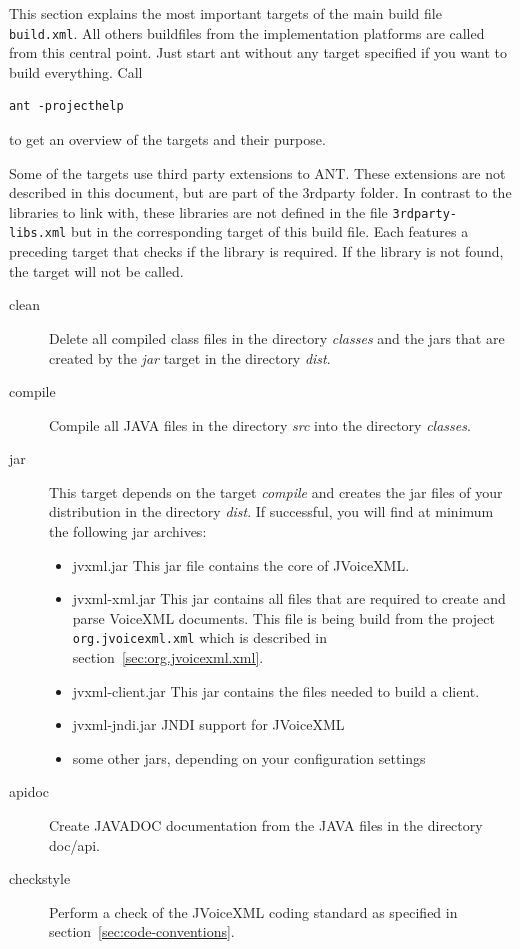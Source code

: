\documentclass[11pt,a4paper]{article}
\begin{document}
This section explains the most important targets of the main build file
\texttt{build.xml}. All others buildfiles from the implementation platforms
are called from this central point. Just start ant without any target specified
if you want to build everything. Call
\begin{lstlisting}
ant -projecthelp
\end{lstlisting}
to get an overview of the targets and their purpose.

Some of the targets use third party extensions to ANT. These 
extensions are not described in this document, but are part of
the 3rdparty folder. In contrast to the libraries to link with,
these libraries are not defined in the file \texttt{3rdparty-libs.xml}
but in the corresponding target of this build file. Each features
a preceding target that checks if the library is required. If
the library is not found, the target will not be called.

\begin{description}
\item[clean]
Delete all compiled class files in the directory \emph{classes}
and the jars that are created by the \emph{jar} target in the directory 
\emph{dist}.

\item[compile]
 Compile all JAVA files in the directory \emph{src} into the directory
\emph{classes}.

\item[jar]
 This target depends on the target \emph{compile} and creates the jar
files of your distribution in the directory \emph{dist}.
If successful, you will find at minimum the following jar archives:
\begin{itemize}
\item jvxml.jar This jar file contains the core of JVoiceXML.
\item jvxml-xml.jar This jar contains all files that are required
to create and parse VoiceXML documents. This file is being build from the
project \texttt{org.jvoicexml.xml} which is described in
section~\ref{sec:org.jvoicexml.xml}.
\item jvxml-client.jar This jar contains the files needed to build
a client.
\item jvxml-jndi.jar JNDI support for JVoiceXML
\item some other jars, depending on your configuration settings
\end{itemize}

\item[apidoc]
Create JAVADOC documentation from the JAVA files in the directory
doc/api.
\item[checkstyle]
Perform a check of the JVoiceXML coding standard as specified 
in section~\ref{sec:code-conventions}.
\end{description}
\end{document}
